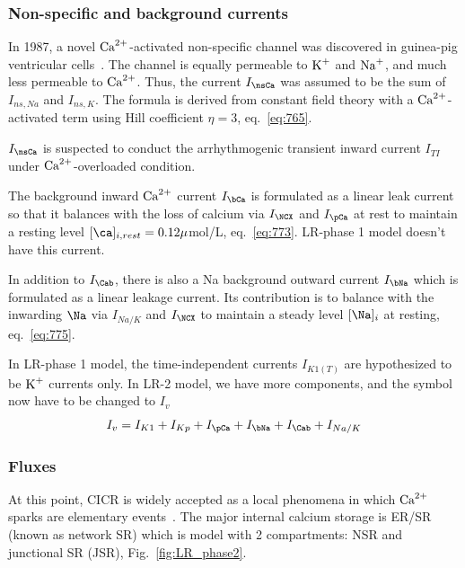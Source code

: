 \subsubsection{Non-specific and background currents}

In 1987, a novel ${\text{Ca}^{2+}}$-activated non-specific channel was
discovered in guinea-pig ventricular cells~\citep{ehara1987can}. The
channel is equally permeable to $\ce{K+}$ and $\ce{Na+}$, and much less
permeable to ${\text{Ca}^{2+}}$. Thus, the current $I_\nsCa$ was assumed to
be the sum of $I_{ns,Na}$ and $I_{ns,K}$. The formula is derived from
constant field theory with a ${\text{Ca}^{2+}}$-activated term using Hill
coefficient $\eta= 3$, eq.~\eqref{eq:765}.

\begin{framed}
  $I_\nsCa$ is suspected to conduct the arrhythmogenic transient
  inward current $I_{TI}$ under ${\text{Ca}^{2+}}$-overloaded condition. 
\end{framed}

The background inward ${\text{Ca}^{2+}}$ current $I_\bCa$ is formulated as a linear
leak current so that it balances with the loss of calcium via $I_\NCX$ and
$I_\pCa$ at rest to maintain a resting level $[\ca]_{i,rest}=0.12\mu$mol/L,
eq.~\eqref{eq:773}.  LR-phase 1 model doesn't have this current.

In addition to $I_\Cab$, there is also a Na background outward current
$I_\bNa$ which is formulated as a linear leakage current. Its
contribution is to balance with the inwarding $\Na$ via $I_{Na/K}$ and $I_\NCX$
to maintain a steady level $[\Na]_i$ at resting, eq.~\eqref{eq:775}. 

In LR-phase 1 model, the time-independent currents $I_{K1(T)}$ are
hypothesized to be $\ce{K+}$ currents only. In LR-2 model, we have more
components, and the symbol now have to be changed to $I_v$
\begin{equation}
  \label{eq:776}
  I_v = I_{K1}+I_{Kp}+ I_\pCa + I_\bNa + I_\Cab + I_{Na/K}
\end{equation}

\subsubsection{Fluxes}
\label{sec:fluxes-2}

At this point, CICR is widely accepted as a local phenomena in which
${\text{Ca}^{2+}}$ sparks are elementary events~\citep{cheng1993cse}.  The
major internal calcium storage is ER/SR (known as network SR) which is model
with 2 compartments: NSR and junctional SR (JSR), Fig.~\ref{fig:LR_phase2}. 

